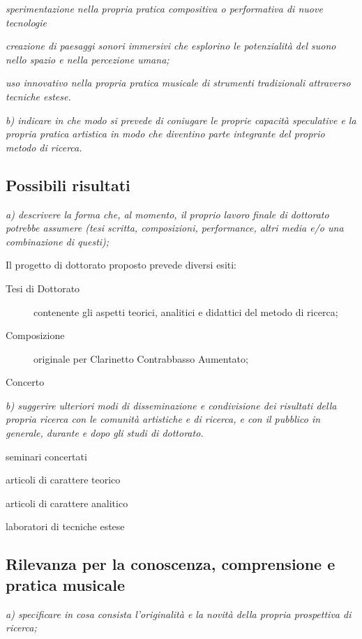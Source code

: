 \documentclass{gs-adonis}
\begin{document}
\emph{sperimentazione nella propria pratica compositiva o performativa di nuove tecnologie}

\emph{creazione di paesaggi sonori immersivi che esplorino le potenzialità del suono nello spazio e nella percezione umana;}

\emph{uso innovativo nella propria pratica musicale di strumenti tradizionali attraverso tecniche estese.}

\emph{b) indicare in che modo si prevede di coniugare le proprie capacità speculative e la propria pratica artistica in modo che diventino parte integrante del proprio metodo di ricerca.}

\subsection{Possibili risultati}%

\emph{a) descrivere la forma che, al momento, il proprio lavoro finale di dottorato potrebbe assumere (tesi scritta, composizioni, performance, altri media e/o una combinazione di questi);}

Il progetto di dottorato proposto prevede diversi esiti:

\begin{description}
  \item[Tesi di Dottorato] contenente gli aspetti teorici, analitici e didattici del metodo di ricerca;
  \item[Composizione] originale per Clarinetto Contrabbasso Aumentato;
  \item[Concerto]
\end{description}

\emph{b) suggerire ulteriori modi di disseminazione e condivisione dei risultati della propria ricerca con le comunità artistiche e di ricerca, e con il pubblico in generale, durante e dopo gli studi di dottorato.}

seminari concertati

articoli di carattere teorico

articoli di carattere analitico

laboratori di tecniche estese

\subsection{Rilevanza per la conoscenza, comprensione e pratica musicale}

\emph{a) specificare in cosa consista l’originalità e la novità della propria prospettiva di ricerca;}
\end{document}
